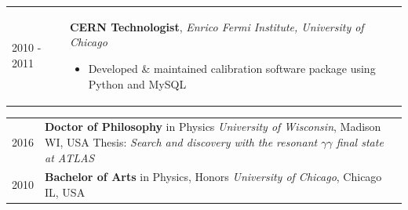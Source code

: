 \documentclass{letter}
\begin{document}
\begin{tabular}{p{}p{}}
  2010 - 2011
  &
  \textbf{CERN Technologist}, \textit{Enrico Fermi Institute, University of Chicago} \newline
  \vspace{-15pt}  %
  \begin{itemize}
    \itemsep0em
    \renewcommand{\labelitemi}{\tiny$\blacksquare$} 
    \item Developed \& maintained calibration software package using Python and MySQL
  \end{itemize}
\end{tabular}
\vspace{-10pt}



\begin{flushleft}
  \Large{\textsc{\textbf{\color{Maroon}{Education}}}}
  \vspace{1pt}  %
\end{flushleft}

  \begin{tabular}{p{}p{}}
  2016
  &
  \textbf{Doctor of Philosophy} in Physics \newline 
  \textit{University of Wisconsin}, Madison WI, USA \newline
  Thesis: \textit{Search and discovery with the resonant $\gamma\gamma$ final state at ATLAS} \newline
  \\

  2010 
  & 
  \textbf{Bachelor of Arts} in Physics, Honors \newline 
  \textit{University of Chicago}, Chicago IL, USA \newline
\end{tabular}
\end{document}
